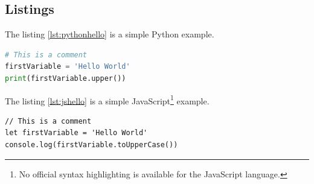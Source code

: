 \subsection{Listings}

The listing \ref{lst:pythonhello} is a simple Python example.

\begin{lstlisting}[caption=Python example, label=lst:pythonhello, language=python]
# This is a comment
firstVariable = 'Hello World'
print(firstVariable.upper())
\end{lstlisting}

The listing \ref{lst:jshello} is a simple JavaScript\footnote{No official syntax highlighting is available for the JavaScript language.} example.

\begin{lstlisting}[caption=JavaScript example, label=lst:jshello]
// This is a comment
let firstVariable = 'Hello World'
console.log(firstVariable.toUpperCase())
\end{lstlisting}